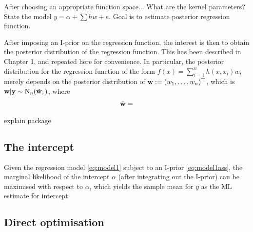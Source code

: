 After choosing an appropriate function space...
What are the kernel parameters? 
State the model $y = \alpha + \sum h w + e$.
Goal is to estimate posterior regression function.

After imposing an I-prior on the regression function, the interest is then to obtain the posterior distribution of the regression function.
This has been described in Chapter 1, and repeated here for convenience.
In particular, the posterior distribution for the regression function of the form $f(x) = \sum_{i=1}^n h(x,x_i)w_i$ merely depends on the posterior distribution of $  {\mathbf w} := (w_1,\dots,w_n)^\top$, which is $  {\mathbf w}|{\mathbf y} \sim \operatorname{N}_n(\tilde{\mathbf w}, )$, where
\begin{align*}
  \begin{gathered}
    \tilde{\mathbf w} = 
  \end{gathered}
\end{align*}

explain package


\subsection{The intercept}

Given the regression model \eqref{eq:model1} subject to an I-prior \eqref{eq:model1ass}, the marginal likelihood of the intercept $\alpha$ (after integrating out the I-prior) can be maximised with respect to $\alpha$, which yields the sample mean for $y$ as the ML estimate for intercept.

\subsection{Direct optimisation}

